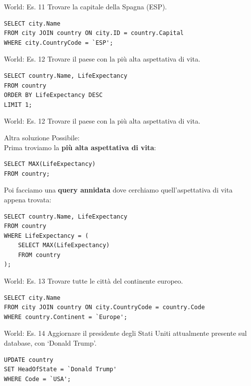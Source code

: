 %
\begin{frame}[fragile]{World: Es. 11}
Trovare la capitale della Spagna (ESP).
\pause
\begin{lstlisting}
SELECT city.Name
FROM city JOIN country ON city.ID = country.Capital
WHERE city.CountryCode = `ESP';
\end{lstlisting}
\end{frame}
%
\begin{frame}[fragile]{World: Es. 12}
Trovare il paese con la pi\`u alta aspettativa di vita.
\pause
\begin{lstlisting}
SELECT country.Name, LifeExpectancy
FROM country
ORDER BY LifeExpectancy DESC
LIMIT 1;
\end{lstlisting}
\end{frame}
%
\begin{frame}[fragile]{World: Es. 12}
Trovare il paese con la pi\`u alta aspettativa di vita.

Altra soluzione Possibile:
\pause
\\Prima troviamo la \textbf{pi\`u alta aspettativa di vita}:
\begin{lstlisting}
SELECT MAX(LifeExpectancy)
FROM country;
\end{lstlisting}
\pause
Poi facciamo una \textbf{query annidata} dove cerchiamo quell'aspettativa di vita appena trovata:
\begin{lstlisting}
SELECT country.Name, LifeExpectancy
FROM country
WHERE LifeExpectancy = (
    SELECT MAX(LifeExpectancy)
    FROM country
);
\end{lstlisting}
\end{frame}
%
\begin{frame}[fragile]{World: Es. 13}
Trovare tutte le citt\`a del continente europeo.
\pause
\begin{lstlisting}
SELECT city.Name
FROM city JOIN country ON city.CountryCode = country.Code
WHERE country.Continent = `Europe';
\end{lstlisting}
\end{frame}
%
\begin{frame}[fragile]{World: Es. 14}
Aggiornare il presidente degli Stati Uniti attualmente presente sul database, con `Donald Trump'.
\pause
\begin{lstlisting}
UPDATE country
SET HeadOfState = `Donald Trump'
WHERE Code = `USA';
\end{lstlisting}
\end{frame}
%

